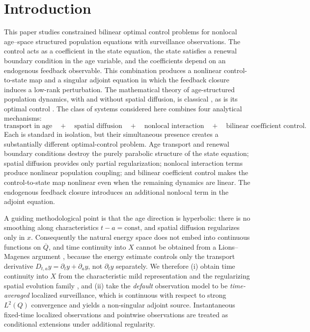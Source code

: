 \documentclass[pdflatex,sn-mathphys-num]{sn-jnl}
\theoremstyle{plain}
\theoremstyle{definition}
\theoremstyle{remark}
\begin{document}
\maketitle

\section{Introduction}
\label{sec:intro}
This paper studies constrained bilinear optimal control problems for nonlocal
age--space structured population equations with surveillance observations. The
control acts as a coefficient in the state equation, the state satisfies a
renewal boundary condition in the age variable, and the coefficients depend on
an endogenous feedback observable. This combination produces a nonlinear
control-to-state map and a singular adjoint equation in which the feedback
closure induces a low-rank perturbation. The mathematical theory of
age-structured population dynamics, with and without spatial diffusion, is
classical \cite{webb1985theory,iannelli1995mathematical,langlais1985nonlinear,webb2008population,langlais1988large,nag2025analysis,wang2025analysis1,kang2026principal,kang2025global,wang2025analysis}, as is its optimal control
\cite{yu2026pattern,anita2013analysis,barbu2012mathematical,lions1971optimal}. The class of systems considered here combines
four analytical mechanisms:
\[
\text{transport in age}
\quad+\quad
\text{spatial diffusion}
\quad+\quad
\text{nonlocal interaction}
\quad+\quad
\text{bilinear coefficient control}.
\]
Each is standard in isolation, but their simultaneous presence creates a
substantially different optimal-control problem. Age transport and renewal
boundary conditions destroy the purely parabolic structure of the state
equation; spatial diffusion provides only partial regularization; nonlocal
interaction terms produce nonlinear population coupling; and bilinear
coefficient control makes the control-to-state map nonlinear even when the
remaining dynamics are linear. The endogenous feedback closure introduces an
additional nonlocal term in the adjoint equation.

A guiding methodological point is that the age direction is hyperbolic: there
is no smoothing along characteristics $t-a=\mathrm{const}$, and spatial
diffusion regularizes only in $x$. Consequently the natural energy space does
not embed into continuous functions on $\overline Q$, and time continuity into
$X$ cannot be obtained from a Lions--Magenes argument
\cite{lions2012non}, because the energy estimate controls only the transport
derivative $D_{t,a}y=\partial_t y+\partial_a y$, not $\partial_t y$ separately.
We therefore (i) obtain time continuity into $X$ from the characteristic mild
representation and the regularizing spatial evolution family
\cite{pazy2012semigroups,acquistapace1987unified,wang2026algebraic}, and (ii) take the \emph{default} observation
model to be \emph{time-averaged} localized surveillance, which is continuous
with respect to strong $L^2(Q)$ convergence and yields a non-singular adjoint
source. Instantaneous fixed-time localized observations and pointwise
observations are treated as conditional extensions under additional regularity.
\end{document}
